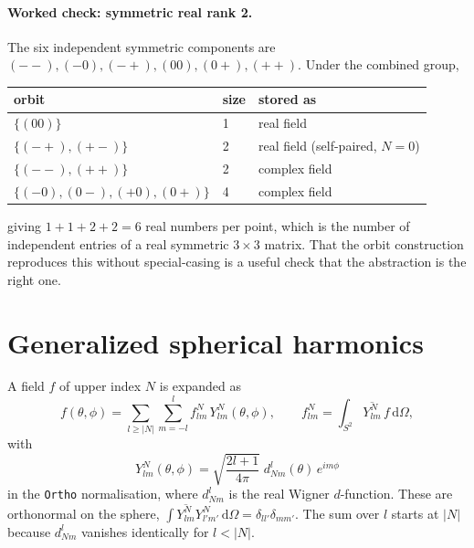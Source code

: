 \documentclass[11pt,a4paper]{article}
\newcommand{\conj}[1]{\overline{#1}}
\newcommand{\dOmega}{\,\mathrm{d}\Omega}
\begin{document}
\paragraph{Worked check: symmetric real rank 2.}  The six independent
symmetric components are $(--), (-0), (-+), (00), (0+), (++)$.  Under the
combined group,
\begin{center}
  \begin{tabular}{lll}
    \toprule
    orbit & size & stored as \\
    \midrule
    $\{(00)\}$                    & 1 & real field \\
    $\{(-+), (+-)\}$              & 2 & real field (self-paired, $N=0$) \\
    $\{(--), (++)\}$              & 2 & complex field \\
    $\{(-0), (0-), (+0), (0+)\}$  & 4 & complex field \\
    \bottomrule
  \end{tabular}
\end{center}
giving $1 + 1 + 2 + 2 = 6$ real numbers per point, which is the number of
independent entries of a real symmetric $3\times3$ matrix.  That the
orbit construction reproduces this without special-casing is a useful
check that the abstraction is the right one.

\section{Generalized spherical harmonics}
\label{sec:gsh}

A field $f$ of upper index $N$ is expanded as
\begin{equation}
  f(\theta,\phi) = \sum_{l \geq |N|} \sum_{m=-l}^{l}
    f^{N}_{lm}\, Y^{N}_{lm}(\theta,\phi),
  \qquad
  f^{N}_{lm} = \int_{S^2} \conj{Y^{N}_{lm}}\, f \dOmega ,
  \label{eq:expansion}
\end{equation}
with
\begin{equation}
  Y^{N}_{lm}(\theta,\phi)
    = \sqrt{\frac{2l+1}{4\pi}}\; d^{l}_{Nm}(\theta)\, e^{im\phi}
  \label{eq:gsh}
\end{equation}
in the \texttt{Ortho} normalisation, where $d^{l}_{Nm}$ is the real
Wigner $d$-function.  These are orthonormal on the sphere,
$\int \conj{Y^{N}_{lm}} Y^{N}_{l'm'} \dOmega = \delta_{ll'}\delta_{mm'}$.
The sum over $l$ starts at $|N|$ because $d^{l}_{Nm}$ vanishes
identically for $l < |N|$.
\end{document}
